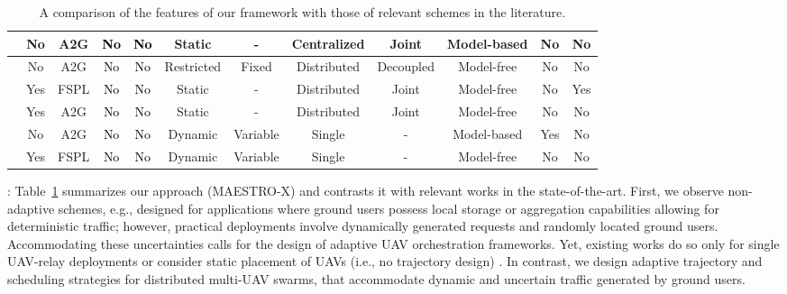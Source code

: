 \documentclass[12pt, draftcls, onecolumn]{IEEEtran}
\theoremstyle{plain}
\theoremstyle{definition}
\theoremstyle{remark}
\newcommand\hlt[1]{\textcolor{black}{#1}}
\begin{document}
\begin{table}
\begin{center}
\begin{tabular}{|*{12}{c|}}
    \hline
    \cite{MultiDroneDeployment} & No & A2G & \hlt{No} & \hlt{No} & Static & - & Centralized & Joint & Model-based & No & No\\
    \hline
    \cite{RLSenseSend} & No & A2G & \hlt{No} & \hlt{No} & Restricted & Fixed & Distributed & Decoupled & Model-free & No & No\\
    \hline
    \cite{DQNPositioning} & Yes & FSPL & \hlt{No} & \hlt{No} & Static & - & Distributed & Joint & Model-free & No & Yes\\
    \hline
    \cite{MLDeployment} & Yes & A2G & \hlt{No} & \hlt{No} & Static & - & Distributed & Joint & Model-free & No & No\\
    \hline
    \cite{Rician} & No & A2G & \hlt{No} & \hlt{No} & Dynamic & Variable & Single & - & Model-based & Yes & No\\
    \hline
    \cite{UAV-DRL} & Yes & FSPL & \hlt{No} & \hlt{No} & Dynamic & Variable & Single & - & Model-free & No & No\\
    \hline
    \end{tabular}
    \vspace{-2mm}
    \caption{A comparison of the features of our framework with those of relevant schemes in the literature.}
    \label{T1}
\end{center}
\vspace{-4mm}
\end{table}

: Table~\ref{T1} summarizes our approach (MAESTRO-X) and contrasts it with relevant works in the state-of-the-art. First, we observe non-adaptive schemes, e.g., \cite{SCA, JointTrajectoryDesign, MultiDroneDeployment} designed for applications where ground users possess local storage or aggregation capabilities allowing for deterministic traffic; however, practical deployments involve dynamically generated requests and randomly located ground users. Accommodating these uncertainties calls for the design of adaptive UAV orchestration frameworks. Yet, existing works do so only for single UAV-relay deployments \cite{UAV-DRL} or consider static placement of UAVs (i.e., no trajectory design) \cite{UAVDynamicCoverage, DQNPositioning, MLDeployment}. In contrast, we design adaptive trajectory and scheduling strategies for distributed multi-UAV swarms, that accommodate dynamic and uncertain traffic generated by ground users.
\end{document}
